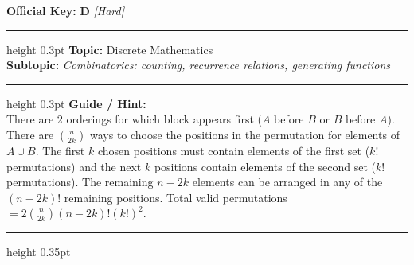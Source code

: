 \documentclass[a4paper,10pt]{article}
\begin{document}
\begin{tcolorbox}
\textbf{Official Key:} \textbf{\large D} \hfill \textit{\small [Hard]}
\vspace{2pt}\hrule height 0.3pt\vspace{3pt}
\textbf{Topic:} Discrete Mathematics \\
\textbf{Subtopic:} \textit{Combinatorics: counting, recurrence relations, generating functions}
\vspace{2pt}\hrule height 0.3pt\vspace{3pt}
\textbf{Guide / Hint:} \\
{\small There are 2 orderings for which block appears first ($A$ before $B$ or $B$ before $A$). There are $\binom{n}{2k}$ ways to choose the positions in the permutation for elements of $A \cup B$. The first $k$ chosen positions must contain elements of the first set ($k!$ permutations) and the next $k$ positions contain elements of the second set ($k!$ permutations). The remaining $n - 2k$ elements can be arranged in any of the $(n - 2k)!$ remaining positions. Total valid permutations $= 2 \binom{n}{2k} (n - 2k)! (k!)^2$.}

\end{tcolorbox}
\vspace{6pt}\hrule height 0.35pt\vspace{6pt}
\noindent
\end{document}
